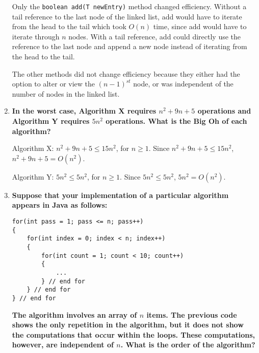 \documentclass[10pt]{article}
\begin{document}
\begin{enumerate}
			\vspace{0.5cm}
			Only the \texttt{boolean add(T newEntry)} method changed efficiency. Without a tail reference to the last node of the linked list, add would have to iterate from the head to the tail which took $O(n)$ time, since add would have to iterate through $n$ nodes. With a tail reference, add could directly use the reference to the last node and append a new node instead of iterating from the head to the tail.
			
			\vspace{0.5cm}
			The other methods did not change efficiency because they either had the option to alter or view the $(n - 1)^{st}$ node, or was independent of the number of nodes in the linked list.
			\vspace{0.5cm}
		
		\setcounter{enumi}{6}
		\item \textbf{In the worst case, Algorithm X requires $n^2 + 9n + 5$ operations and Algorithm Y requires $5n^2$ operations. What is the Big Oh of each algorithm?}
		
			\vspace{0.5cm}
			Algorithm X: $n^2 + 9n + 5 \leq 15n^2$, for $n \geq 1$. Since $n^2 + 9n + 5 \leq 15n^2$, $n^2 + 9n + 5 = O(n^2)$.
			
			\vspace{0.5cm}
			Algorithm Y: $5n^2 \leq 5n^2$, for $n \geq 1$. Since $5n^2 \leq 5n^2$, $5n^2 = O(n^2)$.
			\vspace{0.5cm}
		
		\setcounter{enumi}{9}
		\item \textbf{Suppose that your implementation of a particular algorithm appears in Java as follows:}
			\begin{lstlisting}
for(int pass = 1; pass <= n; pass++)
{
    for(int index = 0; index < n; index++)
    {
        for(int count = 1; count < 10; count++)
        {
            ...
        } // end for
    } // end for
} // end for
			\end{lstlisting}
			\textbf{The algorithm involves an array of $n$ items. The previous code shows the only repetition in the algorithm, but it does not show the computations that occur within the loops. These computations, however, are independent of $n$. What is the order of the algorithm?}
			

\end{enumerate}
\end{document}
